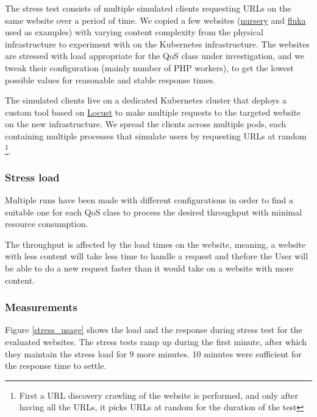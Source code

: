 The stress test consists of multiple simulated clients requesting URLs on the same website over a period of time.
We copied a few websites (\href{https://nurseryschool.web.cern.ch/}{nursery} and \href{https://fluka.cern/}{fluka} used as examples) with varying content complexity from the physical infrastructure to experiment with on the Kubernetes infrastructure.
The websites are stressed with load appropriate for the QoS class under investigation, and we tweak their configuration (mainly number of PHP workers),
to get the lowest possible values for reasonable and stable response times.

The simulated clients live on a dedicated Kubernetes cluster that deploys a custom tool based on \hyperlink{locust.io}{Locust} to make multiple requests to the targeted website on the new infrastructure. 
We spread the clients across multiple pods, each containing multiple processes that simulate users by requesting URLs at random
\footnote{First a URL discovery crawling of the website is performed, and only after having all the URLs, it picks URLs at random for the duration of the test}.

\subsubsection*{Stress load}

Multiple runs have been made with different configurations in order to find a suitable one for each QoS class to process the desired throughput with minimal resource consumption.

The throughput is affected by the load times on the website, meaning, a website with less content will take less time to handle a request and thefore the User will be able to do a new request faster than it would take on a website with more content.


\subsubsection*{Measurements}
\label{sec:measurements}

Figure \ref{stress_usage} shows the load and the response during stress test for the evaluated websites.
The stress tests ramp up during the first minute, after which they maintain the stress load for 9 more minutes.
10 minutes were sufficient for the response time to settle.

